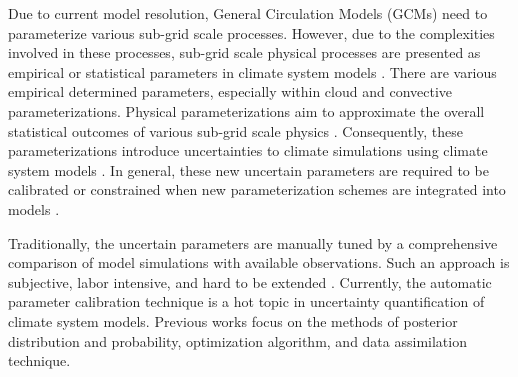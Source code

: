 \documentclass[gmd, manuscript]{copernicus}
\begin{document}
\introduction  %

Due to current model resolution, General Circulation Models (GCMs) need to parameterize various sub-grid scale processes. However, due to the complexities involved in these processes, sub-grid scale physical processes are presented as empirical or statistical parameters in climate system models \citep{hack1994climate}. There are various empirical determined parameters, especially within cloud and convective parameterizations. Physical parameterizations aim to approximate the overall statistical outcomes of various sub-grid scale physics \citep{williams2005modelling}. Consequently, these parameterizations introduce uncertainties to climate simulations using climate system models \citep{warren1979seasonal}. In general, these new uncertain parameters are required to be calibrated or constrained when new parameterization schemes are integrated into models \citep{li2013evaluation}.


Traditionally, the uncertain parameters are manually tuned by a comprehensive comparison of model simulations with available observations. Such an approach is subjective, labor intensive, and hard to be extended \citep{hakkarainen2012closure, allen2000quantifying}. Currently, the automatic parameter calibration technique is a hot topic in uncertainty quantification of climate system models. Previous works focus on the methods of posterior distribution and probability, optimization algorithm, and data assimilation technique.
\end{document}
